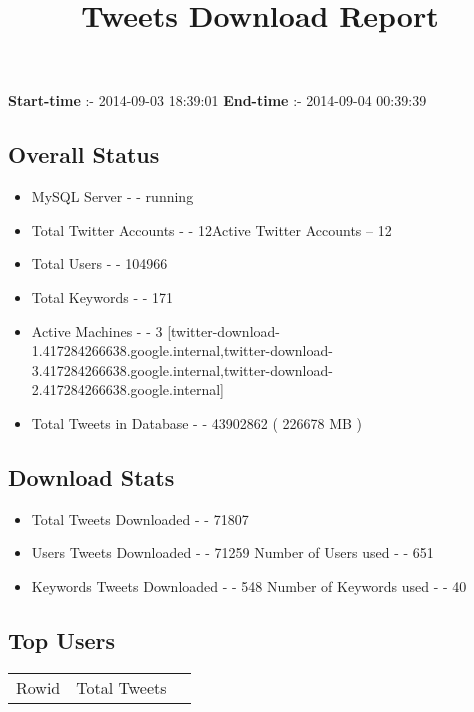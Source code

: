 \documentclass{article}\usepackage[T1]{fontenc}
\begin{document}
\title{\textbf{Tweets Download Report}}
               \date{}
                \maketitle
               \centerline{\textbf{Start-time} :- 2014-09-03 18:39:01 \hspace{40pt} \textbf{End-time} :- 2014-09-04 00:39:39}               \subsection*{Overall Status}                \begin{itemize}                \item MySQL Server - - running               \item Total Twitter Accounts - - 12\newline Active Twitter Accounts -- 12               \item Total Users - - 104966               \item Total Keywords - - 171               \item Active Machines - - 3 [twitter-download-1.417284266638.google.internal,twitter-download-3.417284266638.google.internal,twitter-download-2.417284266638.google.internal]               \item Total Tweets in Database - - 43902862 ( 226678 MB )               \end{itemize}               \subsection*{Download Stats}                \begin{itemize}                \item Total Tweets Downloaded - - 71807               \item Users Tweets Downloaded - - 71259 \newline Number of Users used - - 651               \item Keywords Tweets Downloaded - - 548 \newline Number of Keywords used - - 40              \end{itemize}              \subsection*{Top Users}\begin{tabular}{|c|c|c|}         \hline         Rowid & Total Tweets \\ 

\end{tabular}
\end{document}
